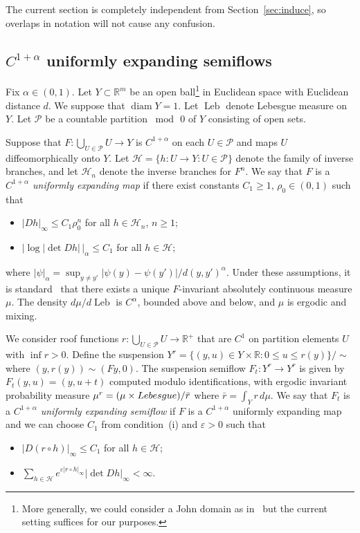 \documentclass[12pt]{article}
\numberwithin{equation}{section}
\newcommand{\R}{{\mathbb R}}
\newcommand{\cH}{{\mathcal H}}
\newcommand{\cP}{{\mathcal P}}
\newcommand{\eps}{\varepsilon}
\newcommand{\Leb}{\operatorname{Leb}}
\newcommand{\diam}{\operatorname{diam}}
\begin{document}
The current section is completely independent from Section~\ref{sec:induce}, so overlaps in notation will not cause any confusion.

\subsection{$C^{1+\alpha}$ uniformly expanding semiflows}
\label{sec:semiflow}

Fix $\alpha\in(0,1)$. Let $Y\subset\R^m$ be an open ball\footnote{More generally, we could consider a John domain as in~\cite{AGY06} but the current setting suffices for our purposes.} in Euclidean space with Euclidean distance $d$. We suppose that $\diam Y=1$. Let $\Leb$ denote Lebesgue measure on $Y$.  Let $\cP$ be a countable partition $\bmod\, 0$ of $Y$ consisting of open sets. 

Suppose that $F:\bigcup_{U\in\cP}U\to Y$ is $C^{1+\alpha}$ on each $U\in\cP$ and maps $U$ diffeomorphically onto $Y$.
Let $\cH=\{h:U\to Y:U\in\cP\}$ denote the family of inverse branches, and let $\cH_n$  denote the inverse branches for $F^n$.
We say that $F$ is a \emph{$C^{1+\alpha}$ uniformly expanding map} if there exist constants $C_1\ge1$, $\rho_0\in(0,1)$ such that 
\begin{itemize}
\item[(i)] $|Dh|_\infty\le C_1\rho_0^n$ for all $h\in\cH_n$, $n\ge1$;
\item[(ii)] $|\log|\det Dh|\,|_\alpha\le C_1$ for all $h\in\cH$;
\end{itemize}
where $|\psi|_\alpha=\sup_{y\neq y'}|\psi(y)-\psi(y')|/d(y,y')^\alpha$.
Under these assumptions, it is standard~\cite{Aaronson} that there exists a unique $F$-invariant absolutely continuous measure $\mu$. The density $d\mu/d\Leb$ is $C^\alpha$, bounded above and below, and $\mu$ is ergodic and mixing.

We consider roof functions $r:\bigcup_{U\in\cP}U\to\R^+$  that are $C^1$ on partition elements $U$ with $\inf r>0$. 
Define the suspension $Y^r=\{(y,u)\in Y\times\R:0\le u\le r(y)\}/\sim$ where 
$(y,r(y))\sim(Fy,0)$. The suspension semiflow $F_t:Y^r\to Y^r$ is given by
$F_t(y,u)=(y,u+t)$ computed modulo identifications, with ergodic invariant probability measure $\mu^r=(\mu\times{\rm Lebesgue})/\bar r$ where $\bar r=\int_Yr\,d\mu$.
We say that $F_t$ is a \emph{$C^{1+\alpha}$ uniformly expanding semiflow} if 
$F$ is a $C^{1+\alpha}$ uniformly expanding map and 
we can choose $C_1$ from condition~(i)  and $\eps>0$ such that
\begin{itemize}
\item[(iii)] $|D(r\circ h)|_\infty \le C_1$ for all $h\in\cH$;
\item[(iv)] $\sum_{h\in\cH} e^{\eps|r\circ h|_\infty}|\det Dh|_\infty <\infty$.
\end{itemize}
\end{document}
